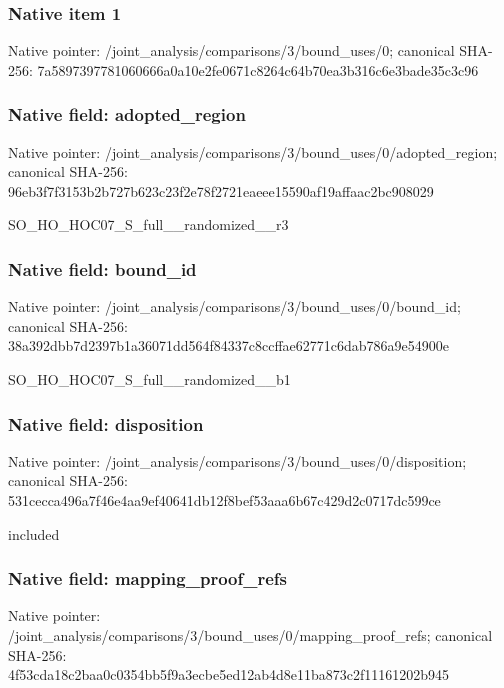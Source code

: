 \documentclass[10pt,a4paper]{article}
\begin{document}
\subsubsection{Native item 1}
Native pointer: /joint\_\allowbreak{}analysis/comparisons/3/bound\_\allowbreak{}uses/0; canonical SHA-256: 7a5897397781060666a0a10e2fe0671c8264c64b70ea3b316c6e3bade35c3c96

\subsubsection{Native field: adopted\_\allowbreak{}region}
Native pointer: /joint\_\allowbreak{}analysis/comparisons/3/bound\_\allowbreak{}uses/0/adopted\_\allowbreak{}region; canonical SHA-256: 96eb3f7f3153b2b727b623c23f2e78f2721eaeee15590af19affaac2bc908029

\begingroup\raggedright\sloppy SO\_\allowbreak{}HO\_\allowbreak{}HOC07\_\allowbreak{}S\_\allowbreak{}full\_\allowbreak{}\_\allowbreak{}randomized\_\allowbreak{}\_\allowbreak{}r3\par\endgroup

\subsubsection{Native field: bound\_\allowbreak{}id}
Native pointer: /joint\_\allowbreak{}analysis/comparisons/3/bound\_\allowbreak{}uses/0/bound\_\allowbreak{}id; canonical SHA-256: 38a392dbb7d2397b1a36071dd564f84337c8ccffae62771c6dab786a9e54900e

\begingroup\raggedright\sloppy SO\_\allowbreak{}HO\_\allowbreak{}HOC07\_\allowbreak{}S\_\allowbreak{}full\_\allowbreak{}\_\allowbreak{}randomized\_\allowbreak{}\_\allowbreak{}b1\par\endgroup

\subsubsection{Native field: disposition}
Native pointer: /joint\_\allowbreak{}analysis/comparisons/3/bound\_\allowbreak{}uses/0/disposition; canonical SHA-256: 531cecca496a7f46e4aa9ef40641db12f8bef53aaa6b67c429d2c0717dc599ce

\begingroup\raggedright\sloppy included\par\endgroup

\subsubsection{Native field: mapping\_\allowbreak{}proof\_\allowbreak{}refs}
Native pointer: /joint\_\allowbreak{}analysis/comparisons/3/bound\_\allowbreak{}uses/0/mapping\_\allowbreak{}proof\_\allowbreak{}refs; canonical SHA-256: 4f53cda18c2baa0c0354bb5f9a3ecbe5ed12ab4d8e11ba873c2f11161202b945
\end{document}
